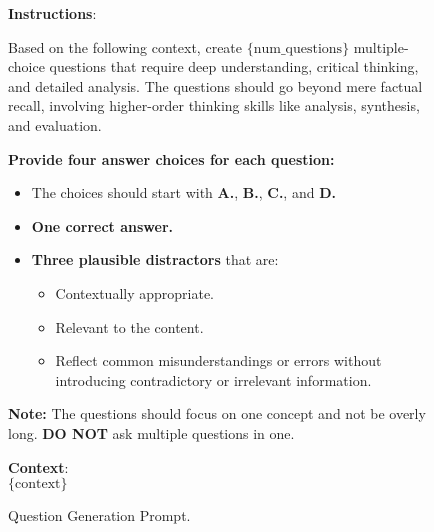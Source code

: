 \begin{figure}[h]
\centering
\begin{tcolorbox}[width=1\columnwidth, fontupper=\footnotesize,title=\Baseline Question Generation Prompt]
\RaggedRight
\obeylines
\textbf{Instructions}: \\
{
Based on the following context, create $\{\text{num\_questions}\}$ multiple-choice questions that require deep understanding, critical thinking, and detailed analysis.  
The questions should go beyond mere factual recall, involving higher-order thinking skills like analysis, synthesis, and evaluation.

\textbf{Provide four answer choices for each question:}
\begin{itemize}[label=-,nosep]
    \item The choices should start with \textbf{A.}, \textbf{B.}, \textbf{C.}, and \textbf{D.}
    \item \textbf{One correct answer.}
    \item \textbf{Three plausible distractors} that are:
    \begin{itemize}[label=$\bullet$,nosep]
        \item Contextually appropriate.
        \item Relevant to the content.
        \item Reflect common misunderstandings or errors without introducing contradictory or irrelevant information.
    \end{itemize}
\end{itemize}
\vspace{3mm}
\textbf{Note:} The questions should focus on one concept and not be overly long.  
\textbf{DO NOT} ask multiple questions in one.
}
\vspace{3mm}
\vspace{3mm}
\textbf{Context}: \\
$\{\text{context}\}$ \\

\end{tcolorbox}
\caption{\Baseline Question Generation Prompt.}
\label{fig:baseline_question_generation_prompt}
\end{figure}


